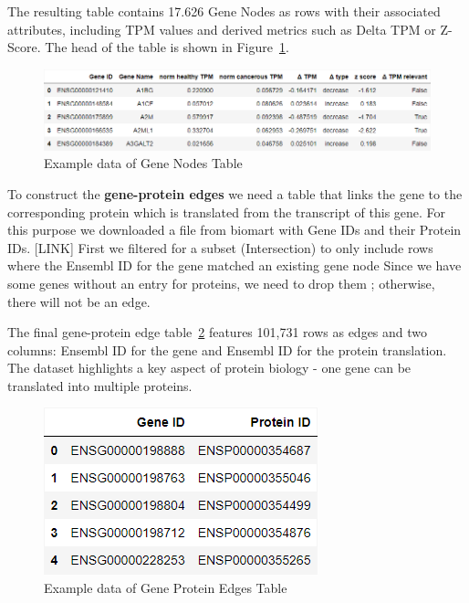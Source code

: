 The resulting table contains 17.626 Gene Nodes as rows with their associated attributes,
including TPM values and derived metrics such as Delta TPM or Z-Score.
The head of the table is shown in Figure~\ref{fig:03_02_df_gene_nodes}.

\begin{figure}[h]
\centering
\includegraphics[height=\dfheight]{figures/03_02_gene_nodes}
\caption{Example data of Gene Nodes Table}
\label{fig:03_02_df_gene_nodes}
\end{figure}


To construct the \textbf{gene-protein edges} we need a table that links the gene to the corresponding protein
which is translated from the transcript of this gene.
For this purpose we downloaded a file from biomart with Gene IDs and their Protein IDs. [LINK]
First we filtered for a subset (Intersection) to only include rows where the Ensembl ID for the gene matched an existing gene node
Since we have some genes without an entry for proteins, we need to drop them ; otherwise, there will not be an edge.

The final gene-protein edge table~\ref{fig:03_02_df_gene_protein_edges} features 101,731 rows as edges and two columns:
Ensembl ID for the gene and Ensembl ID for the protein translation.
The dataset highlights a key aspect of protein biology - one gene can be translated into multiple proteins.

\begin{figure}[h]
\centering
\includegraphics[height=\dfheight]{figures/03_02_gene_protein_edges}
\caption{Example data of Gene Protein Edges Table}
\label{fig:03_02_df_gene_protein_edges}
\end{figure}


